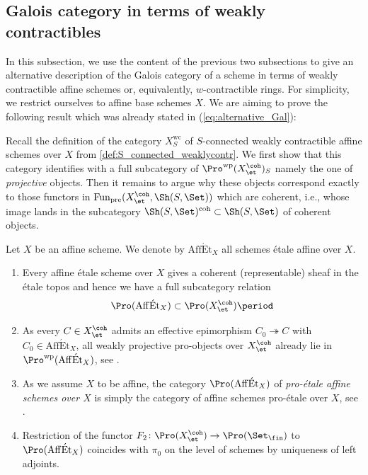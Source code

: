 \documentclass[leqno]{article}
\renewcommand{\Fun}{\mathrm{Fun}}
\renewcommand{\Gal}{\mathrm{Gal}}
\DeclareMathOperator{\FinSet}{\Set_{\fin}}
\DeclareMathOperator{\ProFin}{\Pro(\FinSet)}
\newcommand{\Extr}{\categ{Extr}}
\newcommand{\Et}[1]{\mathrm{\acute{E}t}_{#1}}
\begin{document}
\subsection{Galois category in terms of weakly contractibles}
%
In this subsection, we use the content of the previous two subsections to give an alternative description of the Galois category of a scheme in terms of weakly contractible affine schemes or, equivalently, $w$-contractible rings. For simplicity, we restrict ourselves to affine base schemes $X$.
We are aiming to prove the following result which was already stated in (\ref{eq:alternative_Gal}):
%
%
Recall the definition of the category $X^{\mathrm{wc}}_S$ of $S$-connected weakly contractible affine schemes over $X$ from \cref{def:S_connected_weaklycontr}. We first show that this category identifies with a full subcategory of $\Pro^{\mathrm{wp}}(X_{\et}^{\coh})_S$ namely the one of \textit{projective} objects. Then it remains to argue why these objects correspond exactly to those functors in $\Fun_{\mathrm{pre}}(X_{\et}^{\coh}, \Sh(S, \Set))$ which are coherent, i.e., whose image lands in the subcategory $\Sh(S,\Set)^{\mathrm{coh}}\subset \Sh(S,\Set)$ of coherent objects.
%
\begin{remark}
Let $X$ be an affine scheme. We denote by $\mathrm{Aff}\Et{X}$ all schemes \'etale affine over $X$.
\begin{enumerate}
    \item Every affine \'etale scheme over $X$ gives a coherent (representable) sheaf in the \'etale topos and hence we have a full subcategory relation $$\Pro(\mathrm{Aff}\Et{X})\subset \Pro(X_{\et}^{\coh})\period$$
    \item As every $C\in X_{\et}^{\coh}$ admits an effective epimorphism $C_0\twoheadrightarrow C$ with $C_0\in \mathrm{Aff}\Et{X}$, all weakly projective pro-objects over $X_{\et}^{\coh}$ already lie in $\Pro^{\mathrm{wp}}(\mathrm{Aff}\Et{X})$, see \cite[Remark 6.2.9]{Ultracategories}.
    \item  As we assume $X$ to be affine, the category $\Pro(\mathrm{Aff}\Et{X})$ of \textit{pro-\'etale affine schemes over $X$} is simply the category of affine schemes pro-\'etale over $X$, see \cite[Remark 4.2.5]{MR3379634}.
    \item Restriction of the functor        $F_2\colon\Pro(X_{\et}^{\coh}) \rightarrow \ProFin$ to $\Pro(\mathrm{Aff}\Et{X})$ coincides with $\pi_0$ on the level of schemes by uniqueness of left adjoints.
\end{enumerate}
\end{remark}
\end{document}
